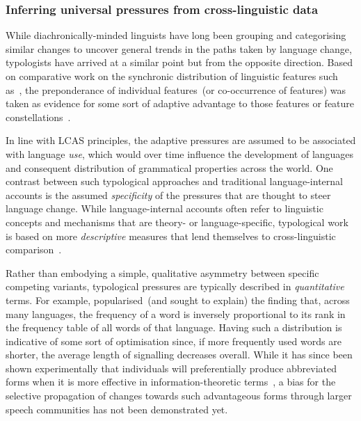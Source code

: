 \subsubsection{Inferring universal pressures from cross-linguistic data}

While diachronically-minded linguists have long been grouping and categorising similar changes to uncover general trends in the paths taken by language change, typologists have arrived at a similar point but from the opposite direction. Based on comparative work on the synchronic distribution of linguistic features such as~\citet{Greenberg1963}, the preponderance of individual features~(or co-occurrence of features) was taken as evidence for some sort of adaptive advantage to those features or feature constellations~\citep{Haspelmath2008}.

In line with LCAS principles, the adaptive pressures are assumed to be associated with language \emph{use}, which would over time influence the development of languages and consequent distribution of grammatical properties across the world.
One contrast between such typological approaches and traditional language-internal accounts is the assumed \emph{specificity} of the pressures that are thought to steer language change. While language-internal accounts often refer to linguistic concepts and mechanisms that are theory- or language-specific, typological work is based on more \emph{descriptive} measures that lend themselves to cross-linguistic comparison~\citep{Haspelmath2010}. %


Rather than embodying a simple, qualitative asymmetry between specific competing variants, typological pressures are typically described in \emph{quantitative} terms. 
For example, \citet{Zipf1935,Zipf1949} popularised~(and sought to explain) the finding that, across many languages, the frequency of a word is inversely proportional to its rank in the frequency table of all words of that language.
Having such a distribution is indicative of some sort of optimisation since, if more frequently used words are shorter, the average length of signalling decreases overall. While it has since been shown experimentally that individuals will preferentially produce abbreviated forms when it is more effective in information-theoretic terms~\citep{Mahowald2013,Kanwal2017}, a bias for the selective propagation of changes towards such advantageous forms through larger speech communities has not been demonstrated yet.

